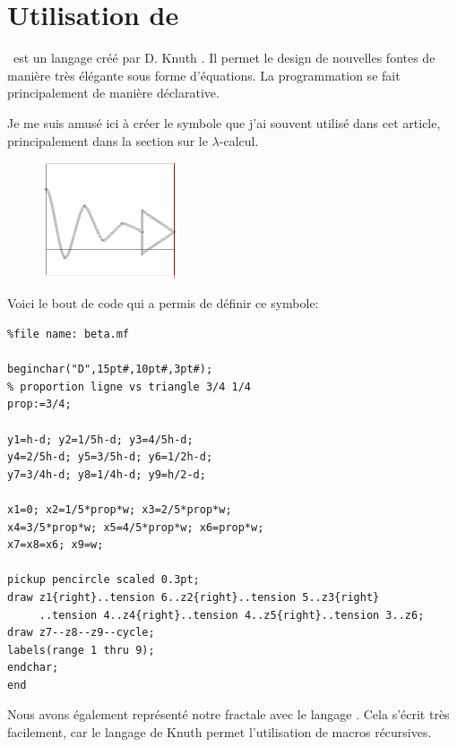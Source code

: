 \section{Utilisation de \MF}
\MF\ est un langage créé par D. Knuth \cite{mf}. Il permet le
design de nouvelles fontes de manière très élégante sous forme d'équations.
La programmation se fait principalement de manière déclarative.

Je me suis  amusé ici à créer le symbole  \imp que j'ai souvent
utilisé dans cet article, principalement dans la section sur le $\lambda$-calcul. 

\begin{figure}[H]
	\centering
	\caption{\imp}
	\includegraphics[width=4.0cm]{imp.png}
\end{figure}
Voici le bout de code qui a permis de définir ce symbole:
\begin{Verbatim}
%file name: beta.mf

beginchar("D",15pt#,10pt#,3pt#);
% proportion ligne vs triangle 3/4 1/4
prop:=3/4;

y1=h-d; y2=1/5h-d; y3=4/5h-d; 
y4=2/5h-d; y5=3/5h-d; y6=1/2h-d;  
y7=3/4h-d; y8=1/4h-d; y9=h/2-d;

x1=0; x2=1/5*prop*w; x3=2/5*prop*w;
x4=3/5*prop*w; x5=4/5*prop*w; x6=prop*w;
x7=x8=x6; x9=w;

pickup pencircle scaled 0.3pt;
draw z1{right}..tension 6..z2{right}..tension 5..z3{right}
     ..tension 4..z4{right}..tension 4..z5{right}..tension 3..z6;
draw z7--z8--z9--cycle; 
labels(range 1 thru 9);
endchar;
end
\end{Verbatim}

Nous avons également représenté notre fractale \snow avec le langage \MF .
Cela s'écrit très facilement, car le langage de Knuth permet l'utilisation
de macros récursives.

